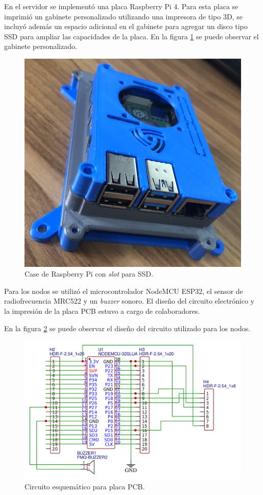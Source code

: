 En el servidor se implementó una placa Raspberry Pi 4. Para esta placa se imprimió un gabinete personalizado utilizando una impresora de tipo 3D, se incluyó además un espacio adicional en el gabinete para agregar un disco tipo SSD para ampliar las capacidades de la placa. En la figura \ref{fig:rbcase} se puede observar el gabinete personalizado.

\begin{figure}[H]
	\centering
	\includegraphics[scale=.30]{./Figures/hardware/rbcase.png}
	\caption{Case de Raspberry Pi con \textit{slot} para SSD.}
	\label{fig:rbcase}
\end{figure}


Para los nodos se utilizó el microcontrolador NodeMCU ESP32, el sensor de radiofrecuencia MRC522 y un \textit{buzzer} sonoro. El diseño del circuito electrónico y la impresión de la placa PCB estuvo a cargo de colaboradores.

En la figura \ref{fig:hwesquematico} se puede observar el diseño del circuito utilizado para los nodos.

\begin{figure}[H]
	\centering
	\includegraphics[width=\textwidth]{./Figures/hardware/esquematico.png}
	\caption{Circuito esquemático para placa PCB.}
	\label{fig:hwesquematico}
\end{figure}

